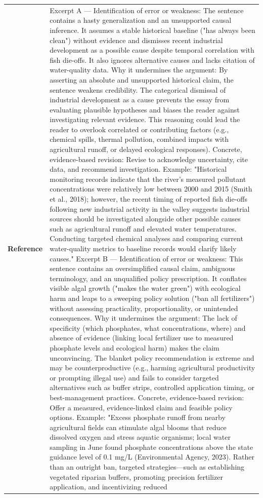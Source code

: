 \begin{longtable}{@{}l p{12.5cm}@{}}
  \textbf{Reference} & Excerpt A --- Identification of error or weakness: The sentence contains a hasty generalization and an unsupported causal inference. It assumes a stable historical baseline ("has always been clean") without evidence and dismisses recent industrial development as a possible cause despite temporal correlation with fish die-offs. It also ignores alternative causes and lacks citation of water-quality data. \newline Why it undermines the argument: By asserting an absolute and unsupported historical claim, the sentence weakens credibility. The categorical dismissal of industrial development as a cause prevents the essay from evaluating plausible hypotheses and biases the reader against investigating relevant evidence. This reasoning could lead the reader to overlook correlated or contributing factors (e.g., chemical spills, thermal pollution, combined impacts with agricultural runoff, or delayed ecological responses). \newline Concrete, evidence-based revision: Revise to acknowledge uncertainty, cite data, and recommend investigation. Example: "Historical monitoring records indicate that the river's measured pollutant concentrations were relatively low between 2000 and 2015 (Smith et al., 2018); however, the recent timing of reported fish die-offs following new industrial activity in the valley suggests industrial sources should be investigated alongside other possible causes such as agricultural runoff and elevated water temperatures. Conducting targeted chemical analyses and comparing current water-quality metrics to baseline records would clarify likely causes." \newline Excerpt B --- Identification of error or weakness: This sentence contains an oversimplified causal claim, ambiguous terminology, and an unqualified policy prescription. It conflates visible algal growth ("makes the water green") with ecological harm and leaps to a sweeping policy solution ("ban all fertilizers") without assessing practicality, proportionality, or unintended consequences. \newline Why it undermines the argument: The lack of specificity (which phosphates, what concentrations, where) and absence of evidence (linking local fertilizer use to measured phosphate levels and ecological harm) makes the claim unconvincing. The blanket policy recommendation is extreme and may be counterproductive (e.g., harming agricultural productivity or prompting illegal use) and fails to consider targeted alternatives such as buffer strips, controlled application timing, or best-management practices. \newline Concrete, evidence-based revision: Offer a measured, evidence-linked claim and feasible policy options. Example: "Excess phosphate runoff from nearby agricultural fields can stimulate algal blooms that reduce dissolved oxygen and stress aquatic organisms; local water sampling in June found phosphate concentrations above the state guidance level of 0.1 mg/L (Environmental Agency, 2023). Rather than an outright ban, targeted strategies---such as establishing vegetated riparian buffers, promoting precision fertilizer application, and incentivizing reduced 
\end{longtable}
